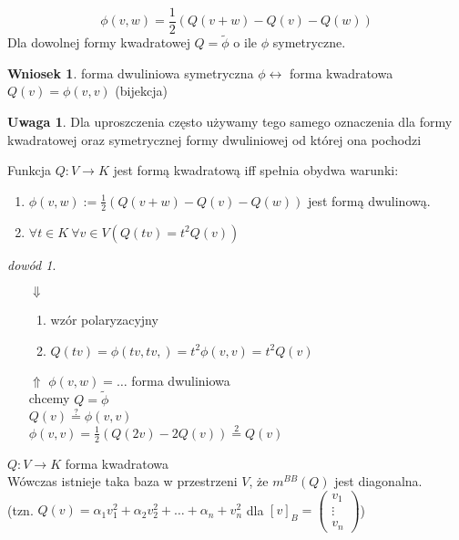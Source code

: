 \documentclass[10pt]{article}
\theoremstyle{definition}
\theoremstyle{definition}
\theoremstyle{definition}
\theoremstyle{definition}
\theoremstyle{remark}
\newtheorem*{dd}{dowód}
\theoremstyle{definition}
\newtheorem*{uw}{Uwaga}
\theoremstyle{definition}
\newtheorem*{wn}{Wniosek}
\theoremstyle{definition}
\theoremstyle{definition}
\theoremstyle{definition}
\begin{document}
\begin{ft} 
    \[ \phi(v,w) = \frac{1}{2} (Q(v+w) - Q(v) - Q(w)) \]
    Dla dowolnej formy kwadratowej $Q = \widetilde \phi$ o ile $\phi$ symetryczne. 
\end{ft}
\begin{wn} 
    forma dwuliniowa symetryczna $\phi \longleftrightarrow$ forma kwadratowa $Q(v) = 
    \phi(v,v)$ \hfill (bijekcja)
\end{wn} 
\begin{uw} 
    Dla uproszczenia często używamy tego samego oznaczenia dla formy kwadratowej oraz 
    symetrycznej formy dwuliniowej od której ona pochodzi
\end{uw} 
\begin{ft} 
    Funkcja $Q: V \to K$ jest formą kwadratową iff spełnia obydwa warunki:
    \begin{enumerate}[(1)]
        \item $\phi(v,w) := \frac{1}{2} (Q(v+w) - Q(v) - Q(w))$ jest formą dwulinową. 
        \item $\forall t \in K \ \forall v \in V ( Q(tv) = t^2 Q(v))$
    \end{enumerate} 
\end{ft} 
\begin{dd} 
    \begin{itemize} \hfill
        \item[$\Downarrow$] \begin{enumerate}[(1)] 
                                \item wzór polaryzacyjny 
                                \item $Q(tv) = \phi(tv,tv,)=t^2 \phi(v,v) = t^2 Q(v)$
                            \end{enumerate} 
        \item[$\Uparrow$] $\phi(v,w) = \ldots $ forma dwuliniowa \\ 
            chcemy $Q = \widetilde \phi$ \\ 
            $Q(v) \overset{?}{=} \phi(v,v)$ \\ 
            $\phi(v,v) = \frac{1}{2} (Q(2v)-2Q(v)) \overset{2}{=}Q(v)$
    \end{itemize} 
\end{dd} 
\begin{tw} 
    $Q: V \to K$ forma kwadratowa \\ 
    Wówczas istnieje taka baza w przestrzeni $V$, że $m^{BB}(Q)$ jest diagonalna.\\
    (tzn. $Q(v) = \alpha_1 v_1^2 + \alpha_2 v_2^2 + \ldots + \alpha_n + v_n^2$ dla 
    $[v]_B = \begin{pmatrix} v_1 \\ \vdots \\ v_n \end{pmatrix}$)
\end{tw} 
\end{document}
